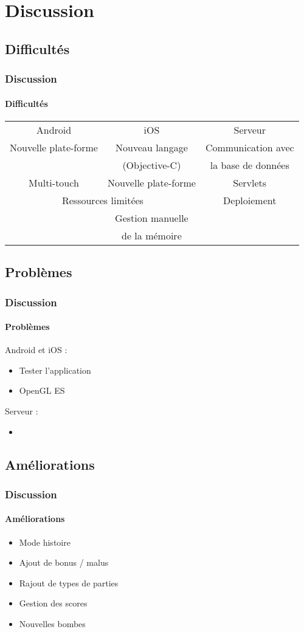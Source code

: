 \section{Discussion}

	\subsection{Difficultés}
		\begin{frame}
			\frametitle{Discussion}
			\framesubtitle{Difficultés}
				\begin{tabular}{ccc}
					Android & iOS & Serveur \\

						Nouvelle plate-forme & Nouveau langage  & Communication avec \\
										 & (Objective-C) & la base de données\\
						Multi-touch & Nouvelle plate-forme &Servlets\\
						\multicolumn{2}{|c|}{Ressources limitées} & Deploiement\\
						  & Gestion manuelle & \\
						  &  de la mémoire & \\

			\end{tabular}
		\end{frame}
		
		
	\subsection{Problèmes}
		\begin{frame}
			\frametitle{Discussion}
			\framesubtitle{Problèmes}
			Android et iOS :
			\begin{itemize}
				\item Tester l'application
				\item OpenGL ES
			\end{itemize}
			
			Serveur :
			\begin{itemize}
				\item 
			\end{itemize}
		\end{frame}
		
		
	\subsection{Améliorations}
		\begin{frame}
			\frametitle{Discussion}
			\framesubtitle{Améliorations}
			\begin{itemize}
				\item Mode histoire
				\item Ajout de bonus / malus
				\item Rajout de types de parties
				\item Gestion des scores
				\item Nouvelles bombes
			\end{itemize}
		\end{frame}
